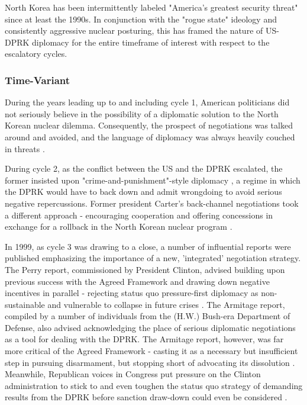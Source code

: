 \documentclass{article}
\begin{document}
North Korea has been intermittently labeled "America's greatest security threat"\cite{cumings} since at least the 1990s. In conjunction with the "rogue state" ideology and consistently aggressive nuclear posturing, this has framed the nature of US-DPRK diplomacy for the entire timeframe of interest with respect to the escalatory cycles.

\subsubsection{Time-Variant}

During the years leading up to and including cycle 1, American politicians did not seriously believe in the possibility of a diplomatic solution to the North Korean nuclear dilemma. Consequently, the prospect of negotiations was talked around and avoided, and the language of diplomacy was always heavily couched in threats \cite{sigal}.

During cycle 2, as the conflict between the US and the DPRK escalated, the former insisted upon "crime-and-punishment"-style diplomacy \cite{bleiker}, a regime in which the DPRK would have to back down and admit wrongdoing to avoid serious negative repercussions. Former president Carter's back-channel negotiations took a different approach - encouraging cooperation and offering concessions in exchange for a rollback in the North Korean nuclear program \cite{sigal}.

In 1999, as cycle 3 was drawing to a close, a number of influential reports were published emphasizing the importance of a new, 'integrated' negotiation strategy. The Perry report, commissioned by President Clinton, advised building upon previous success with the Agreed Framework and drawing down negative incentives in parallel - rejecting status quo pressure-first diplomacy as non-sustainable and vulnerable to collapse in future crises \cite{perry}. The Armitage report, compiled by a number of individuals from the (H.W.) Bush-era Department of Defense, also advised acknowledging the place of serious diplomatic negotiations as a tool for dealing with the DPRK. The Armitage report, however, was far more critical of the Agreed Framework - casting it as a necessary but insufficient step in pursuing disarmament, but stopping short of advocating its dissolution \cite{armitage}. Meanwhile, Republican voices in Congress put pressure on the Clinton administration to stick to and even toughen the status quo strategy of demanding results from the DPRK before sanction draw-down could even be considered \cite{harnisch}. 
\end{document}
